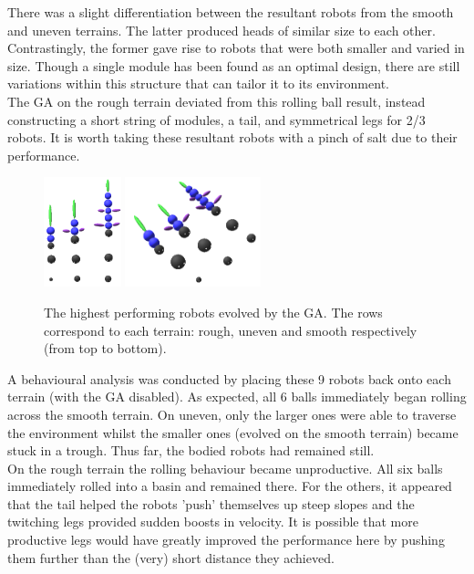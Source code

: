 \documentclass{article}
\begin{document}
There was a slight differentiation between the resultant robots from the smooth and uneven terrains. The latter produced heads of similar size to each other. Contrastingly, the former gave rise to robots that were both smaller and varied in size. Though a single module has been found as an optimal design, there are still variations within this structure that can tailor it to its environment. \\
The GA on the rough terrain deviated from this rolling ball result, instead constructing a short string of modules, a tail, and symmetrical legs for 2/3 robots. It is worth taking these resultant robots with a pinch of salt due to their performance.\\

\begin{figure}[H]
\centering
\centerline{
\includegraphics[width=0.2\textwidth]{best-above}
\includegraphics[width=0.35\textwidth]{best-side}
}
\caption{The highest performing robots evolved by the GA. The rows correspond to each terrain: rough, uneven and smooth respectively (from top to bottom).}
\end{figure}

\newpage
A behavioural analysis was conducted by placing these 9 robots back onto each terrain (with the GA disabled). As expected, all 6 balls immediately began rolling across the smooth terrain. On uneven, only the larger ones were able to traverse the environment whilst the smaller ones (evolved on the smooth terrain) became stuck in a trough. Thus far, the bodied robots had remained still. \\
\noindent On the rough terrain the rolling behaviour became unproductive. All six balls immediately rolled into a basin and remained there. For the others, it appeared that the tail helped the robots 'push' themselves up steep slopes and the twitching legs provided sudden boosts in velocity. It is possible that more productive legs would have greatly improved the performance here by pushing them further than the (very) short distance they achieved.
\end{document}
